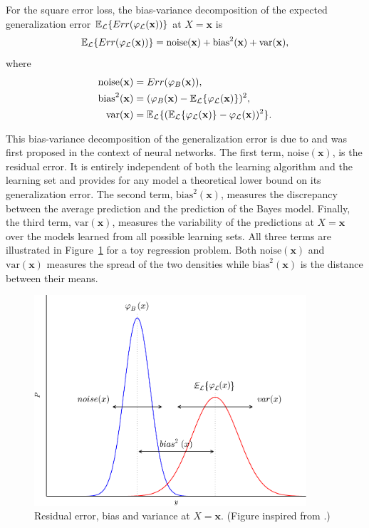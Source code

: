 \begin{theorem}\label{thm:bias-variance}
For the square error loss, the bias-variance decomposition of the expected
generalization error $\mathbb{E}_{\cal L} \{ Err(\varphi_{\cal L}(\mathbf{x}))
\}$ at $X=\mathbf{x}$ is
\begin{equation}
\mathbb{E}_{\cal L} \{ Err(\varphi_{\cal L}(\mathbf{x})) \} = \text{noise}(\mathbf{x}) + \text{bias}^2(\mathbf{x}) + \text{var}(\mathbf{x}),
\end{equation}
where
\begin{align*}
\text{noise}(\mathbf{x}) &= Err(\varphi_B(\mathbf{x})), \\
\text{bias}^2(\mathbf{x}) &= (\varphi_B(\mathbf{x}) - \mathbb{E}_{\cal L} \{ \varphi_{\cal L}(\mathbf{x}) \} )^2, \\
\text{var}(\mathbf{x}) &= \mathbb{E}_{\cal L} \{ (\mathbb{E}_{\cal L} \{ \varphi_{\cal L}(\mathbf{x}) \} - \varphi_{\cal L}(\mathbf{x}))^2 \}.
\end{align*}
\end{theorem}

This bias-variance decomposition of the generalization error is due to
\citet{geman:1992} and was first proposed in the context of neural networks.
The first term, $\text{noise}(\mathbf{x})$, is the residual error. It is
entirely independent of both the learning algorithm and the learning set and
provides for any model a theoretical lower bound on its generalization error.
The second term, $\text{bias}^2(\mathbf{x})$, measures the discrepancy between
the average prediction and the prediction of the Bayes model. Finally, the
third term, $\text{var}(\mathbf{x})$, measures the variability of the
predictions at $X=\mathbf{x}$ over the models learned from all possible
learning sets. All three terms are illustrated in Figure~\ref{fig:bias-variance}
for a toy regression problem. Both $\text{noise}(\mathbf{x})$ and
$\text{var}(\mathbf{x})$ measures the spread of the two densities while
$\text{bias}^2(\mathbf{x})$ is the distance between their means.

\begin{figure}
    \centering
    \includegraphics[width=0.9\textwidth]{figures/ch4_bias_variance.pdf}
    \caption{Residual error, bias and variance at $X=\mathbf{x}$. (Figure inspired from \citep{geurts:2002}.)}
    \label{fig:bias-variance}
\end{figure}


